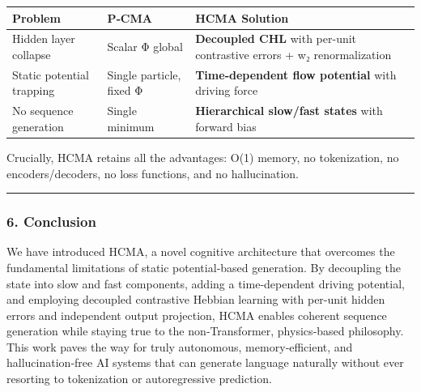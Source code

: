 \documentclass[
  11pt,
  a4paper,
]{article}
\begin{document}
\begin{longtable}[]{@{}
  >{\raggedright\arraybackslash}p{}
  >{\raggedright\arraybackslash}p{}
  >{\raggedright\arraybackslash}p{}@{}}
\toprule\noalign{}
\begin{minipage}[b]{\linewidth}\raggedright
Problem
\end{minipage} & \begin{minipage}[b]{\linewidth}\raggedright
P‑CMA
\end{minipage} & \begin{minipage}[b]{\linewidth}\raggedright
HCMA Solution
\end{minipage} \\
\midrule\noalign{}
\endhead
\bottomrule\noalign{}
\endlastfoot
Hidden layer collapse & Scalar Φ global & \textbf{Decoupled CHL} with
per-unit contrastive errors + w₂ renormalization \\
Static potential trapping & Single particle, fixed Φ &
\textbf{Time‑dependent flow potential} with driving force \\
No sequence generation & Single minimum & \textbf{Hierarchical slow/fast
states} with forward bias \\
\end{longtable}

Crucially, HCMA retains all the advantages: O(1) memory, no
tokenization, no encoders/decoders, no loss functions, and no
hallucination.

\begin{center}\rule{0.5\linewidth}{0.5pt}\end{center}

\subsubsection{6. Conclusion}\label{conclusion-6}

We have introduced HCMA, a novel cognitive architecture that overcomes
the fundamental limitations of static potential‑based generation. By
decoupling the state into slow and fast components, adding a
time‑dependent driving potential, and employing decoupled contrastive
Hebbian learning with per-unit hidden errors and independent output
projection, HCMA enables coherent sequence generation while staying true
to the non‑Transformer, physics‑based philosophy. This work paves the
way for truly autonomous, memory‑efficient, and hallucination‑free AI
systems that can generate language naturally without ever resorting to
tokenization or autoregressive prediction.
\end{document}
